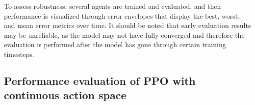 To assess robustness, several agents are trained and evaluated, and their performance is visualized through error envelopes that display the best, worst, and mean error metrics over time. It should be noted that early evaluation results may be unreliable, as the model may not have fully converged and therefore the evaluation is performed after the model has gone through certain training timesteps.

\subsection{Performance evaluation of PPO with continuous action space} \label{subsec: Performance evaluation of PPO with continuous action space}

